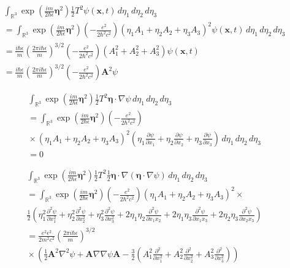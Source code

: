 \documentclass[12pt]{article}
\newcommand\INT{\int_{\mathbb R^3}}
\begin{document}
\begin{align*}
&
\INT
\exp\left(\frac{im}{2\hbar\epsilon}\boldsymbol\eta^2\right)
\tfrac{1}{2} T^2 %
\psi(\mathbf x,t)
\,d\eta_1\,d\eta_2\,d\eta_3
\\
&{}
=\INT
\exp\left(\frac{im}{2\hbar\epsilon}\boldsymbol\eta^2\right)
\left(-\frac{e^2}{2\hbar^2 c^2}\right)
(\eta_1A_1+\eta_2A_2+\eta_3A_3)^2
\psi(\mathbf x,t)
\,d\eta_1\,d\eta_2\,d\eta_3
\\
&{}=\frac{i\hbar\epsilon}{m}
\left(\frac{2\pi i\hbar\epsilon}{m}\right)^{3/2}
\left(-\frac{e^2}{2\hbar^2 c^2}\right)
(A_1^2+A_2^2+A_3^2)\psi(\mathbf x,t)
\\
&{}=\frac{i\hbar\epsilon}{m}
\left(\frac{2\pi i\hbar\epsilon}{m}\right)^{3/2}
\left(-\frac{e^2}{2\hbar^2 c^2}\right)
\mathbf A^2\psi
\tag{13}
\end{align*}

\begin{align*}
&
\INT\exp\left(\frac{im}{2\hbar\epsilon}\boldsymbol\eta^2\right)
\tfrac{1}{2}T^2
\boldsymbol\eta\cdot\nabla\psi
\,d\eta_1\,d\eta_2\,d\eta_3
\\&
{}=\INT\exp\left(\frac{im}{2\hbar\epsilon}\boldsymbol\eta^2\right)
\left(-\frac{e^2}{2\hbar^2 c^2}\right)
\\
&{}\times
(\eta_1A_1+\eta_2A_2+\eta_3A_3)^2
\left(
 \eta_1\frac{\partial\psi}{\partial x_1}
+\eta_2\frac{\partial\psi}{\partial x_2}
+\eta_3\frac{\partial\psi}{\partial x_3}
\right)
\,d\eta_1\,d\eta_2\,d\eta_3
\\
&{}=0
\tag{14}
\end{align*}

\begin{align*}
&
\INT
\exp\left(\frac{im}{2\hbar\epsilon}\boldsymbol\eta^2\right)
\tfrac{1}{2}T^2
\tfrac{1}{2}\boldsymbol\eta\cdot\nabla(\boldsymbol\eta\cdot\nabla\psi)
\,d\eta_1\,d\eta_2\,d\eta_3
\\
&{}=\INT
\exp\left(\frac{im}{2\hbar\epsilon}\boldsymbol\eta^2\right)
\left(-\frac{e^2}{2\hbar^2c^2}\right)
(\eta_1A_1+\eta_2A_2+\eta_3A_3)^2\times{}
\\
&{}\frac{1}{2}
\left(
 \eta_1^2\frac{\partial^2\psi}{\partial x_1^2}
+\eta_2^2\frac{\partial^2\psi}{\partial x_2^2}
+\eta_3^2\frac{\partial^2\psi}{\partial x_3^2}
+2\eta_1\eta_2\frac{\partial^2\psi}{\partial x_1x_2}
+2\eta_1\eta_3\frac{\partial^2\psi}{\partial x_1x_3}
+2\eta_2\eta_3\frac{\partial^2\psi}{\partial x_2x_3}
\right)
\\
&{}=\frac{e^2\epsilon^2}{2m^2c^2}
\left(\frac{2\pi i\hbar\epsilon}{m}\right)^{3/2}
\\
&{}\times
\left(
\frac{1}{2}\mathbf A^2\nabla^2\psi+\mathbf A\nabla\nabla\psi\mathbf A
-\frac{3}{2}
\left(
 A_1^2\frac{\partial^2}{\partial x_1^2}
+A_2^2\frac{\partial^2}{\partial x_2^2}
+A_3^2\frac{\partial^2}{\partial x_3^2}
\right)
\right)
\tag{15}
\end{align*}
\end{document}
